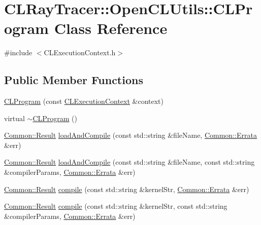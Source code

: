 \hypertarget{class_c_l_ray_tracer_1_1_open_c_l_utils_1_1_c_l_program}{}\section{C\+L\+Ray\+Tracer\+:\+:Open\+C\+L\+Utils\+:\+:C\+L\+Program Class Reference}
\label{class_c_l_ray_tracer_1_1_open_c_l_utils_1_1_c_l_program}


{\ttfamily \#include $<$C\+L\+Execution\+Context.\+h$>$}

\subsection*{Public Member Functions}
\begin{DoxyCompactItemize}
\item 
\hyperlink{class_c_l_ray_tracer_1_1_open_c_l_utils_1_1_c_l_program_aea0f85e2bbe14154ef35e76a0b2d4bfc}{C\+L\+Program} (const \hyperlink{class_c_l_ray_tracer_1_1_open_c_l_utils_1_1_c_l_execution_context}{C\+L\+Execution\+Context} \&context)
\item 
virtual \hyperlink{class_c_l_ray_tracer_1_1_open_c_l_utils_1_1_c_l_program_ad6635a77afc39084c1121976bf56dc30}{$\sim$\+C\+L\+Program} ()
\item 
\hyperlink{_errata_8h_a389396702f1aff6e71eb21328b0775c1}{Common\+::\+Result} \hyperlink{class_c_l_ray_tracer_1_1_open_c_l_utils_1_1_c_l_program_a5ca4ca6e15831c1a15288d15c6fc468f}{load\+And\+Compile} (const std\+::string \&file\+Name, \hyperlink{class_c_l_ray_tracer_1_1_common_1_1_errata}{Common\+::\+Errata} \&err)
\item 
\hyperlink{_errata_8h_a389396702f1aff6e71eb21328b0775c1}{Common\+::\+Result} \hyperlink{class_c_l_ray_tracer_1_1_open_c_l_utils_1_1_c_l_program_ae5d8b838fbbd1634cab210aa8f0ac4f3}{load\+And\+Compile} (const std\+::string \&file\+Name, const std\+::string \&compiler\+Params, \hyperlink{class_c_l_ray_tracer_1_1_common_1_1_errata}{Common\+::\+Errata} \&err)
\item 
\hyperlink{_errata_8h_a389396702f1aff6e71eb21328b0775c1}{Common\+::\+Result} \hyperlink{class_c_l_ray_tracer_1_1_open_c_l_utils_1_1_c_l_program_ae89ea8f8a4183e82b8378f6239c4cdc1}{compile} (const std\+::string \&kernel\+Str, \hyperlink{class_c_l_ray_tracer_1_1_common_1_1_errata}{Common\+::\+Errata} \&err)
\item 
\hyperlink{_errata_8h_a389396702f1aff6e71eb21328b0775c1}{Common\+::\+Result} \hyperlink{class_c_l_ray_tracer_1_1_open_c_l_utils_1_1_c_l_program_a55d7feb88a44ccc9e75ada4a570e2660}{compile} (const std\+::string \&kernel\+Str, const std\+::string \&compiler\+Params, \hyperlink{class_c_l_ray_tracer_1_1_common_1_1_errata}{Common\+::\+Errata} \&err)

\end{DoxyCompactItemize}
